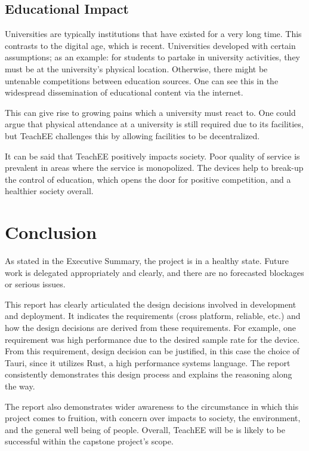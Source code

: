 \documentclass[letterpaper,12pt]{article}
\begin{document}
\subsection{Educational Impact}

Universities are typically institutions that have existed for a very long time.
This contrasts to the digital age, which is recent. Universities developed with
certain assumptions; as an example: for students to partake in university
activities, they must be at the university's physical location. Otherwise, there
might be untenable competitions between education sources. One
can see this in the widespread dissemination of educational content via the
internet.

This can give rise to growing pains which a university must react to. One could
argue that physical attendance at a university is still required due to its
facilities, but TeachEE challenges this by allowing facilities to be
decentralized.

It can be said that TeachEE positively impacts society. Poor quality of
service is prevalent in areas where the service is monopolized. The devices help
to break-up the control of education, which opens the door for positive
competition, and a healthier society overall.


\section{Conclusion}

As stated in the Executive Summary, the project is in a healthy state. Future
work is delegated appropriately and clearly, and there are no forecasted
blockages or serious issues.

This report has clearly articulated the design decisions involved in development
and deployment. It indicates the requirements (cross platform, reliable, etc.)
and how the design decisions are derived from these requirements. For example,
one requirement was high performance due to the desired sample rate for the
device. From this requirement, design decision can be justified, in this case
the choice of Tauri, since it utilizes Rust, a high performance systems
language. The report consistently demonstrates this design process and explains
the reasoning along the way.

The report also demonstrates wider awareness to the circumstance in which this
project comes to fruition, with concern over impacts to society, the
environment, and the general well being of people. Overall, TeachEE will be is
likely to be successful within the capstone project's scope.
\end{document}
